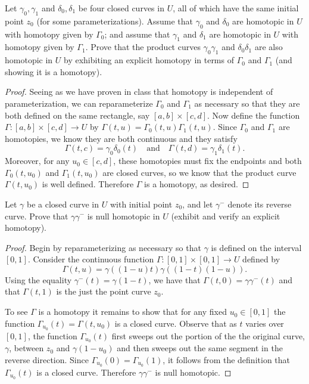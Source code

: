\documentclass[10pt]{amsart}
\begin{document}
\begin{thm}
  \label{Ex4}
  Let $\gamma_0, \gamma_1$ and $\delta_0,\delta_1$ be four closed curves in $U$,
all of which have the same initial point $z_0$ (for some parameterizations).  
Assume that $\gamma_0$ and $\delta_0$ are
homotopic in $U$ with homotopy given by $\Gamma_0$;
and assume that $\gamma_1$ and $\delta_1$ are homotopic in $U$ with homotopy
given by $\Gamma_1$.
Prove that the product curves $\gamma_0 \gamma_1$ and $\delta_0 \delta_1$ are also homotopic
in $U$ by exhibiting an explicit homotopy in terms of $\Gamma_0$ and $\Gamma_1$
(and showing it is a homotopy).
\begin{proof}
  Seeing as we have proven in class that homotopy is independent of parameterization, we can reparameterize $\Gamma_0$ and $\Gamma_1$ as necessary so that they are both defined on the same rectangle, say $[a,b] \times [c,d]$.
  Now define the function $\Gamma: [a,b]\times[c,d] \longrightarrow U$ by $\Gamma(t,u) = \Gamma_0(t,u)\Gamma_1(t,u)$.
  Since $\Gamma_0$ and $\Gamma_1$ are homotopies, we know they are both continuous and they satisfy
  $$\Gamma(t,c) = \gamma_0\delta_0(t) \quad \text{and} \quad \Gamma(t,d) = \gamma_1\delta_1(t).$$
  Moreover, for any $u_0 \in [c,d]$, these homotopies must fix the endpoints and both $\Gamma_0(t,u_0)$ and $\Gamma_1(t,u_0)$ are closed curves, so we know that the product curve $\Gamma(t,u_0)$ is well defined.
  Therefore $\Gamma$ is a homotopy, as desired.
\end{proof}
\end{thm}

\begin{thm}
  \label{Ex5}
  Let $\gamma$ be a closed curve in $U$ with initial point $z_0$, and let
$\gamma^{-}$ denote its reverse curve.
Prove that $\gamma \gamma^{-}$ is null homotopic
in $U$ (exhibit and verify an explicit homotopy).
\begin{proof}
  Begin by reparameterizing as necessary so that $\gamma$ is defined on the interval $[0,1]$.  
  Consider the continuous function $\Gamma: [0,1]\times[0,1] \longrightarrow U$ defined by
  $$\Gamma(t,u) = \gamma((1-u)t)\gamma((1-t)(1-u)).$$
  Using the equality $\gamma^-(t) = \gamma(1-t)$, we have that $\Gamma(t,0) = \gamma\gamma^-(t)$ and that $\Gamma(t,1)$ is the just the point curve $z_0$.
    
  To see $\Gamma$ is a homotopy it remains to show that for any fixed ${u_0} \in [0,1]$ the function $\Gamma_{u_0}(t) = \Gamma(t,{u_0})$ is a closed curve.
  Observe that as $t$ varies over $[0,1]$, the function $\Gamma_{u_0}(t)$ first sweeps out the portion of the the original curve, $\gamma$, between  $z_0$ and $\gamma(1-u_0)$ and then sweeps out the same segment in the reverse direction.
  Since $\Gamma_{u_0}(0) = \Gamma_{u_0}(1)$, it follows from the definition that $\Gamma_{u_0}(t)$ is a closed curve.
  Therefore $\gamma\gamma^-$ is null homotopic.
\end{proof}
\end{thm}
\end{document}
